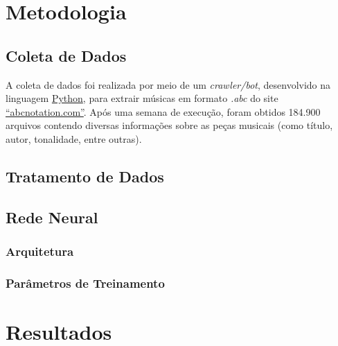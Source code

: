 \documentclass{automatextcc}
\begin{document}
\chapter{Metodologia}

\section{Coleta de Dados}


A coleta de dados foi realizada por meio de um \textit{crawler/bot}, desenvolvido na linguagem \href{https://python.org/}{Python}, para extrair músicas em formato \textit{.abc} do site \href{https://abcnotation.com/}{``abcnotation.com''}. Após uma semana de execução, foram obtidos 184.900 arquivos contendo diversas informações sobre as peças musicais (como título, autor, tonalidade, entre outras).

\section{Tratamento de Dados}


\section{Rede Neural}
\subsection{Arquitetura}
\subsection{Parâmetros de Treinamento}

\chapter{Resultados}
\end{document}
